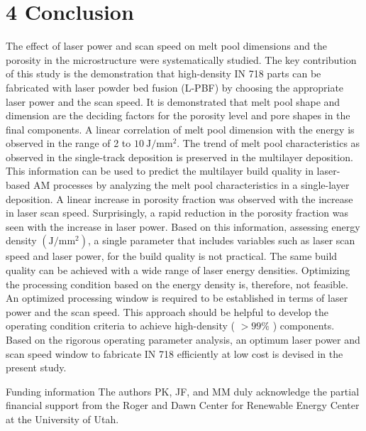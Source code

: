 \documentclass[10pt]{article}
\begin{document}
\section*{4 Conclusion}
The effect of laser power and scan speed on melt pool dimensions and the porosity in the microstructure were systematically studied. The key contribution of this study is the demonstration that high-density IN 718 parts can be fabricated with laser powder bed fusion (L-PBF) by choosing the appropriate laser power and the scan speed. It is demonstrated that melt pool shape and dimension are the deciding factors for the porosity level and pore shapes in the final components. A linear correlation of melt pool dimension with the energy is observed in the range of 2 to $10 \mathrm{~J} / \mathrm{mm}^{2}$. The trend of melt pool characteristics as observed in the single-track deposition is preserved in the multilayer deposition. This information can be used to predict the multilayer build quality in laser-based AM processes by analyzing the melt pool characteristics in a single-layer deposition. A linear increase in porosity fraction was observed with the increase in laser scan speed. Surprisingly, a rapid reduction in the porosity fraction was seen with the increase in laser power. Based on this information, assessing energy density $\left(\mathrm{J} / \mathrm{mm}^{2}\right)$, a single parameter that includes variables such as laser scan speed and laser power, for the build quality is not practical. The same build quality can be achieved with a wide range of laser energy densities. Optimizing the processing condition based on the energy density is, therefore, not feasible. An optimized processing window is required to be established in terms of laser power and the scan speed. This approach should be helpful to develop the operating condition criteria to achieve high-density ( $>99 \%$ ) components. Based on the rigorous operating parameter analysis, an optimum laser power and scan speed window to fabricate IN 718 efficiently at low cost is devised in the present study.

Funding information The authors PK, JF, and MM duly acknowledge the partial financial support from the Roger and Dawn Center for Renewable Energy Center at the University of Utah.
\end{document}
